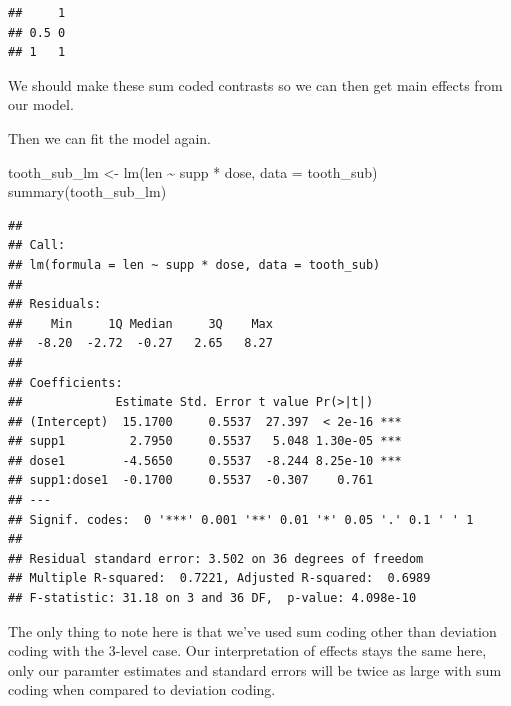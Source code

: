 \documentclass[
]{book}
\newenvironment{Shaded}{\begin{snugshade}}{\end{snugshade}}
\newcommand{\AttributeTok}[1]{\textcolor[rgb]{0.77,0.63,0.00}{#1}}
\newcommand{\FunctionTok}[1]{\textcolor[rgb]{0.00,0.00,0.00}{#1}}
\newcommand{\NormalTok}[1]{#1}
\newcommand{\OtherTok}[1]{\textcolor[rgb]{0.56,0.35,0.01}{#1}}
\newcommand{\SpecialCharTok}[1]{\textcolor[rgb]{0.00,0.00,0.00}{#1}}
\begin{document}
\begin{verbatim}
##     1
## 0.5 0
## 1   1
\end{verbatim}

We should make these sum coded contrasts so we can then get main effects from our model.

\begin{Shaded}
\end{Shaded}

Then we can fit the model again.

\begin{Shaded}
\begin{Highlighting}[]
\NormalTok{tooth\_sub\_lm }\OtherTok{\textless{}{-}} \FunctionTok{lm}\NormalTok{(len }\SpecialCharTok{\textasciitilde{}}\NormalTok{ supp }\SpecialCharTok{*}\NormalTok{ dose, }\AttributeTok{data =}\NormalTok{ tooth\_sub)}
\FunctionTok{summary}\NormalTok{(tooth\_sub\_lm)}
\end{Highlighting}
\end{Shaded}

\begin{verbatim}
## 
## Call:
## lm(formula = len ~ supp * dose, data = tooth_sub)
## 
## Residuals:
##    Min     1Q Median     3Q    Max 
##  -8.20  -2.72  -0.27   2.65   8.27 
## 
## Coefficients:
##             Estimate Std. Error t value Pr(>|t|)    
## (Intercept)  15.1700     0.5537  27.397  < 2e-16 ***
## supp1         2.7950     0.5537   5.048 1.30e-05 ***
## dose1        -4.5650     0.5537  -8.244 8.25e-10 ***
## supp1:dose1  -0.1700     0.5537  -0.307    0.761    
## ---
## Signif. codes:  0 '***' 0.001 '**' 0.01 '*' 0.05 '.' 0.1 ' ' 1
## 
## Residual standard error: 3.502 on 36 degrees of freedom
## Multiple R-squared:  0.7221, Adjusted R-squared:  0.6989 
## F-statistic: 31.18 on 3 and 36 DF,  p-value: 4.098e-10
\end{verbatim}

The only thing to note here is that we've used sum coding other than deviation coding with the 3-level case. Our interpretation of effects stays the same here, only our paramter estimates and standard errors will be twice as large with sum coding when compared to deviation coding.
\end{document}
